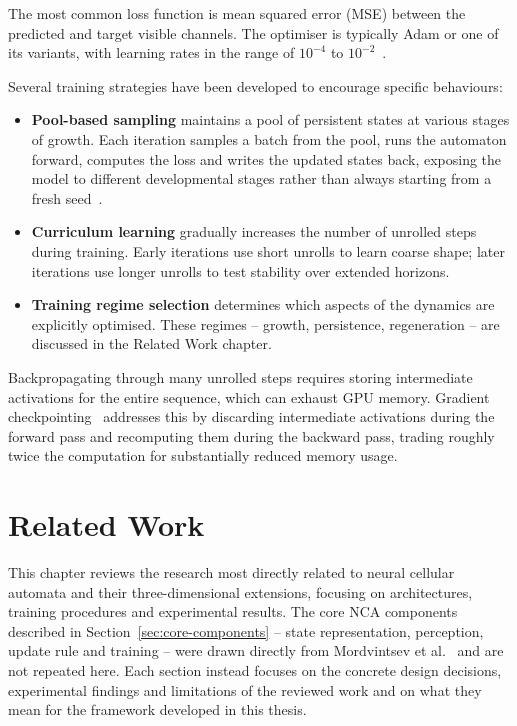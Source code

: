 The most common loss function is mean squared error (MSE) between the predicted and
target visible channels. The optimiser is typically Adam or one of its variants, with
learning rates in the range of $10^{-4}$ to $10^{-2}$~\cite{Sudhakaran2021}.

Several training strategies have been developed to encourage specific behaviours:
\begin{itemize}
    \item \textbf{Pool-based sampling} maintains a pool of persistent states at
    various stages of growth. Each iteration samples a batch from the pool, runs the
    automaton forward, computes the loss and writes the updated states back,
    exposing the model to different developmental stages rather than always starting
    from a fresh seed~\cite{Mordvintsev2020}.
    \item \textbf{Curriculum learning} gradually increases the number of unrolled
    steps during training. Early iterations use short unrolls to learn coarse shape;
    later iterations use longer unrolls to test stability over extended horizons.
    \item \textbf{Training regime selection} determines which aspects of the dynamics
    are explicitly optimised. These regimes -- growth, persistence, regeneration --
    are discussed in the Related Work chapter.
\end{itemize}

Backpropagating through many unrolled steps requires storing intermediate activations
for the entire sequence, which can exhaust GPU memory. Gradient
checkpointing~\cite{PaszkePyTorch} addresses this by discarding intermediate
activations during the forward pass and recomputing them during the backward pass,
trading roughly twice the computation for substantially reduced memory usage.

\chapter{Related Work}

This chapter reviews the research most directly related to neural cellular automata
and their three-dimensional extensions, focusing on architectures, training
procedures and experimental results. The core NCA components described in
Section~\ref{sec:core-components} -- state representation, perception, update rule
and training -- were drawn directly from Mordvintsev et al.~\cite{Mordvintsev2020}
and are not repeated here. Each section instead focuses on the concrete design
decisions, experimental findings and limitations of the reviewed work and on what
they mean for the framework developed in this thesis.

